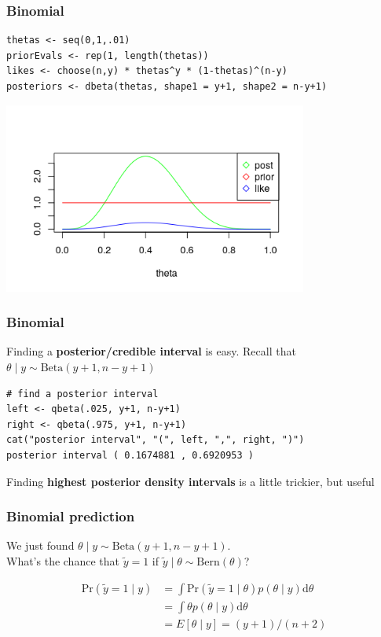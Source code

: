 \documentclass{beamer}
\begin{document}


\begin{frame}[fragile]
\frametitle{Binomial}

\begin{verbatim}
thetas <- seq(0,1,.01)
priorEvals <- rep(1, length(thetas))
likes <- choose(n,y) * thetas^y * (1-thetas)^(n-y)
posteriors <- dbeta(thetas, shape1 = y+1, shape2 = n-y+1)
\end{verbatim}

\begin{center}
\includegraphics[width=100mm]{pics/Rplot}
\end{center}

\end{frame}


\begin{frame}[fragile]
\frametitle{Binomial}

Finding a {\bf posterior/credible interval} is easy. Recall that $\theta \mid y \sim \text{Beta}(y+1, n-y+1)$


\begin{verbatim}
# find a posterior interval
left <- qbeta(.025, y+1, n-y+1)
right <- qbeta(.975, y+1, n-y+1)
cat("posterior interval", "(", left, ",", right, ")")
posterior interval ( 0.1674881 , 0.6920953 )
\end{verbatim}

Finding {\bf highest posterior density intervals} is a little trickier, but useful
\end{frame}



\begin{frame}[fragile]
\frametitle{Binomial prediction}

We just found $\theta \mid y \sim \text{Beta}(y+1, n-y+1)$. \\
What's the chance that $\tilde{y} = 1$ if $\tilde{y} \mid \theta \sim \text{Bern}(\theta)$?
\pause

\begin{align*}
\text{Pr}(\tilde{y}=1 \mid y) &= \int \text{Pr}(\tilde{y} =1 \mid \theta) p(\theta \mid y) \text{d}\theta \\
&= \int \theta p(\theta \mid y) \text{d}\theta \\
&= E[\theta \mid y] = (y+1)/(n+2)
\end{align*}


\end{frame}
\end{document}
